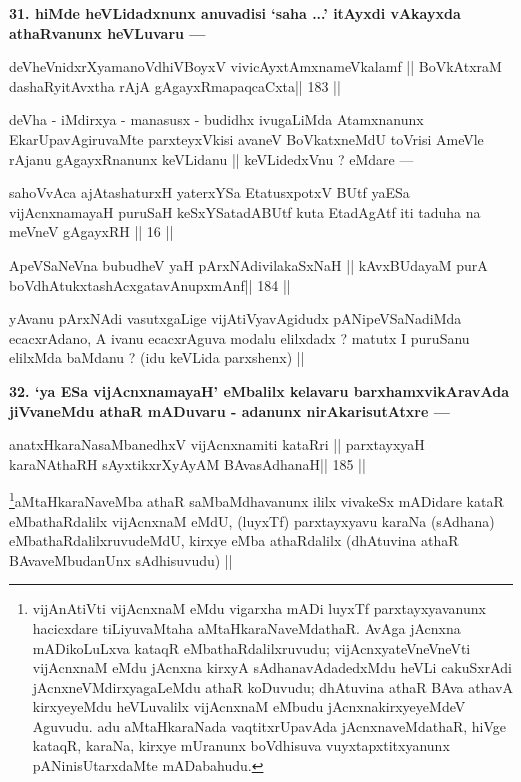 \begin{artha}
{\bf 31. hiMde heVLidadxnunx anuvadisi `saha ...' itAyxdi vAkayxda athaRvanunx heVLuvaru ---}
\end{artha}

\begin{shl}
deVheVnidxrXyamanoVdhiVBoyxV vivicAyx\s\s tAmxnameVkalamf ||
BoVkAtxraM dashaRyitAvx\s tha rAjA gAgayxRmapaqcaCxta\hfill || 183 ||
\end{shl}

\begin{artha}
deVha - iMdirxya - manasusx - budidhx ivugaLiMda Atamxnanunx EkarUpavAgiruvaMte parxteyxVkisi avaneV BoVkatxneMdU toVrisi AmeVle rAjanu gAgayxRnanunx keVLidanu || keVLidedxVnu ? eMdare ---
\end{artha}

\begin{shl}
sahoVvAca ajAtashaturxH yaterxYSa EtatusxpotxV\s
BUtf yaESa vijAcnxnamayaH puruSaH keSxYSatadABUtf
kuta EtadAgAtf iti taduha na meVneV gAgayxRH || 16 ||
\end{shl}

\begin{shl}
ApeVSaNeVna bubudheV yaH pArxNAdivilakaSxNaH ||
kAvxBUdayaM purA boVdhAtukxtashAcx\s\s gatavAnupxmAnf\hfill || 184 ||
\end{shl}

\begin{artha}
yAvanu pArxNAdi vasutxgaLige vijAtiVyavAgidudx pANipeVSaNadiMda 
ecacxrAdano, A ivanu ecacxrAguva modalu elilxdadx ? matutx I puruSanu elilxMda baMdanu ? (idu keVLida parxshenx) ||
\end{artha}

\begin{artha}
{\bf 32. `ya ESa vijAcnxnamayaH' eMbalilx kelavaru barxhamxvikAravAda jiVvaneMdu athaR mADuvaru - adanunx nirAkarisutAtxre ---}
\end{artha}

\begin{shl}
anatxHkaraNasaMbanedhxV vijAcnxnamiti kataRri ||
parxtayxyaH karaNAthaRH sAyxtikxrXyAyAM BAvasAdhanaH\hfill || 185 ||
\end{shl}

\begin{artha}
\footnote{vijAnAtiVti vijAcnxnaM eMdu vigarxha mADi luyxTf 
parxtayxyavanunx hacicxdare tiLiyuvaMtaha aMtaHkaraNaveMdathaR. AvAga 
jAcnxna mADikoLuLxva kataqR eMbathaRdalilxruvudu; vijAcnxyateV\s neVneVti vijAcnxnaM eMdu jAcnxna kirxyA sAdhanavAdadedxMdu heVLi cakuSxrAdi jAcnxneVMdirxyagaLeMdu athaR koDuvudu; dhAtuvina athaR BAva athavA kirxyeyeMdu heVLuvalilx vijAcnxnaM eMbudu jAcnxnakirxyeyeMdeV Aguvudu. adu aMtaHkaraNada vaqtitxrUpavAda jAcnxnaveMdathaR, hiVge kataqR, karaNa, kirxye mUranunx boVdhisuva vuyxtapxtitxyanunx pANinisUtarxdaMte mADabahudu.}aMtaHkaraNaveMba athaR saMbaMdhavanunx ililx vivakeSx mADidare kataR eMbathaRdalilx vijAcnxnaM eMdU, (luyxTf) parxtayxyavu karaNa (sAdhana) eMbathaRdalilxruvudeMdU, kirxye eMba athaRdalilx (dhAtuvina athaR BAvaveMbudanUnx sAdhisuvudu) ||
\end{artha}

